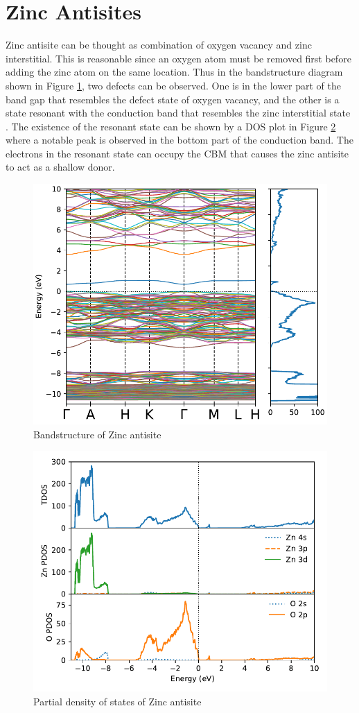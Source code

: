 \section{Zinc Antisites}
Zinc antisite can be thought as combination of oxygen vacancy and zinc interstitial. This is reasonable since an oxygen atom must be removed first before adding the zinc atom on the same location.  Thus in the bandstructure diagram shown in Figure \ref{fig:bands.Zn-anti}, two defects can be observed. One is in the lower part of the band gap that resembles the defect state of oxygen vacancy, and the other is a state resonant with the conduction band that resembles the zinc interstitial state \citep{Janotti2007}. The existence of the resonant state can be shown by a DOS plot in Figure \ref{fig:dos.Zn-anti} where a notable peak is observed in the bottom part of the conduction band. The electrons in the resonant state can occupy the CBM that causes the zinc antisite to act as a shallow donor. 

\begin{figure}[tbh!]
	\centering
	\includegraphics[width=0.6\linewidth]{"images/rnd/band-dos_Zn_anti"}
	\caption[Bandstructure of Zinc antisite]{Bandstructure of Zinc antisite}
	\label{fig:bands.Zn-anti}
\end{figure}

\begin{figure}[tbh!]
	\centering
	\includegraphics[width=0.6\linewidth]{"images/rnd/dos-pdos_Zn_anti"}
	\caption[Partial density of states of Zinc antisite]{Partial density of states of Zinc antisite}
	\label{fig:dos.Zn-anti}
\end{figure}


